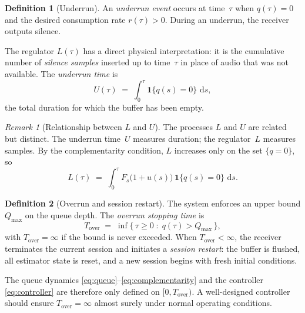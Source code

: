 \documentclass[11pt, a4paper]{article}
\theoremstyle{definition}
\newtheorem{definition}{Definition}[section]
\theoremstyle{plain}
\theoremstyle{remark}
\newtheorem{remark}{Remark}[section]
\newcommand{\dd}{\,\mathrm{d}}                   %
\begin{document}
\begin{definition}[Underrun]\label{def:underrun}
  An \emph{underrun event} occurs at time~$\tau$ when $q(\tau) = 0$
  and the desired consumption rate $r(\tau) > 0$.
  During an underrun, the receiver outputs silence.

  The regulator $L(\tau)$ has a direct physical interpretation:
  it is the cumulative number of \emph{silence samples} inserted
  up to time~$\tau$ in place of audio that was not available.
  The \emph{underrun time} is
  \begin{equation}\label{eq:underrun-time}
    U(\tau) \;=\; \int_0^{\tau} \mathbf{1}\{q(s) = 0\}\,\dd s,
  \end{equation}
  the total duration for which the buffer has been empty.
\end{definition}

\begin{remark}[Relationship between $L$ and $U$]
  The processes $L$ and $U$ are related but distinct.  The underrun
  time~$U$ measures duration; the regulator~$L$ measures samples.
  By the complementarity condition, $L$ increases only on the set
  $\{q = 0\}$, so
  \begin{equation}\label{eq:L-U-relation}
    L(\tau) \;=\; \int_0^{\tau} F_s\bigl(1 + u(s)\bigr)
      \,\mathbf{1}\{q(s) = 0\}\,\dd s.
  \end{equation}
\end{remark}

\begin{definition}[Overrun and session restart]\label{def:overrun}
  The system enforces an upper bound $Q_{\max}$ on the queue depth.
  The \emph{overrun stopping time} is
  \begin{equation}\label{eq:overrun-time}
    T_{\text{over}} \;=\; \inf\bigl\{\,\tau \ge 0 \;:\;
      q(\tau) > Q_{\max}\,\bigr\},
  \end{equation}
  with $T_{\text{over}} = \infty$ if the bound is never exceeded.
  When $T_{\text{over}} < \infty$, the receiver terminates the
  current session and initiates a \emph{session restart}: the buffer
  is flushed, all estimator state is reset, and a new session begins
  with fresh initial conditions.

  The queue dynamics \eqref{eq:queue}--\eqref{eq:complementarity}
  and the controller \eqref{eq:controller} are therefore only defined
  on $[0, T_{\text{over}})$.  A well-designed controller should ensure
  $T_{\text{over}} = \infty$ almost surely under normal operating
  conditions.
\end{definition}
\end{document}
